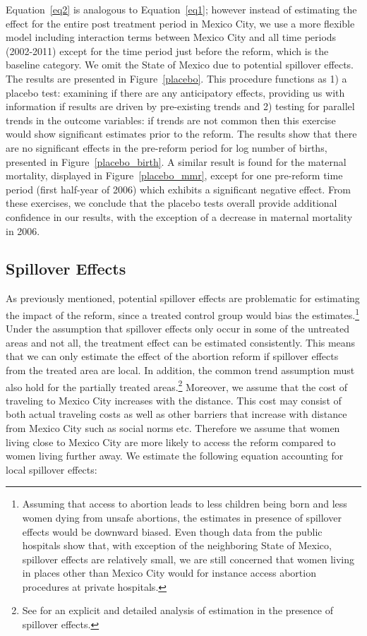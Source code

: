 \documentclass[a4paper, 11pt]{article}
\begin{document}
\begin{spacing}{2}
 Equation~\ref{eq2} is analogous to Equation~\ref{eq1}; however instead of estimating the effect for the entire post treatment period in Mexico City, we use a more flexible model including interaction terms between Mexico City and all time periods (2002-2011) except for the time period just before the reform, which is the baseline category. We omit the State of Mexico due to potential spillover effects. The results are presented in Figure~\ref{placebo}. This procedure functions as 1) a placebo test: examining if there are any anticipatory effects, providing us with information if results are driven by pre-existing trends and 2) testing for parallel trends in the outcome variables: if trends are not common then this exercise would show significant estimates prior to the reform. The results show that there are no significant effects in the pre-reform period for log number of births, presented in Figure~\ref{placebo_birth}. A similar result  is found for the maternal mortality, displayed in Figure~\ref{placebo_mmr}, except for one pre-reform time period (first half-year of 2006) which exhibits a significant negative effect. From these exercises, we conclude that the placebo tests overall provide additional confidence in our results, with the exception of a decrease in maternal mortality in 2006.
 

   	  

\subsection{Spillover Effects}\label{Spillover}
As previously mentioned, potential spillover effects are problematic for estimating the impact of the reform, since a treated control group would bias the estimates.\footnote{Assuming that access to abortion leads to less children being born and less women dying from unsafe abortions, the estimates in presence of spillover effects would be downward biased. Even though data from the public hospitals show that, with exception of the neighboring State of Mexico, spillover effects are relatively small, we are still concerned that women living in places other than Mexico City would for instance access abortion procedures at private hospitals.} Under the assumption that spillover effects only occur in some of the untreated areas and not all, the treatment effect can be estimated consistently. This means that we can only estimate the effect of the abortion reform if spillover effects from the treated area are local. In addition, the common trend assumption must also hold for the partially treated areas.\footnote{See {\color{blue}{Clarke, 2015}} for an explicit and detailed analysis of estimation in the presence of spillover effects.} Moreover, we assume that the cost of traveling to Mexico City increases with the distance. This cost may consist of both actual traveling costs as well as other barriers that increase with distance from Mexico City such as social norms etc. Therefore  we assume that women living close to Mexico City are more likely to access the reform compared to women living further away. We estimate the following equation accounting for local spillover effects:


\end{spacing}
\end{document}
